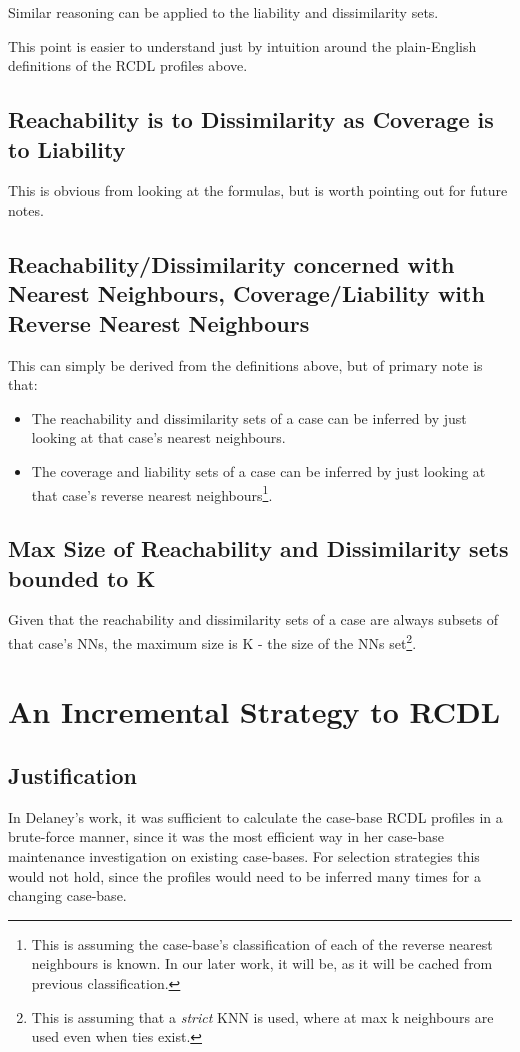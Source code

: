 \documentclass[a4paper,11pt]{report}
\begin{document}
Similar reasoning can be applied to the liability and dissimilarity sets.

This point is easier to understand just by intuition around the plain-English definitions of the RCDL profiles above.

\subsection{Reachability is to Dissimilarity as Coverage is to Liability}
This is obvious from looking at the formulas, but is worth pointing out for future notes.

\subsection{Reachability/Dissimilarity concerned with Nearest Neighbours, Coverage/Liability with Reverse Nearest Neighbours \label{sec:RdWithNnClWithRnn}}
This can simply be derived from the definitions above, but of primary note is that:
\begin{itemize}
	\item The reachability and dissimilarity sets of a case can be inferred by just looking at that case's nearest neighbours.
	\item The coverage and liability sets of a case can be inferred by just looking at that case's reverse nearest neighbours\footnote{This is assuming the case-base's classification of each of the reverse nearest neighbours is known. In our later work, it will be, as it will be cached from previous classification.}.
\end{itemize}

\subsection{Max Size of Reachability and Dissimilarity sets bounded to K}
Given that the reachability and dissimilarity sets of a case are always subsets of that case's NNs, the maximum size is K - the size of the NNs set\footnote{This is assuming that a \emph{strict} KNN is used, where at max k neighbours are used even when ties exist.}.

\section{An Incremental Strategy to RCDL\label{sec:incrstrategy}}
\subsection{Justification} 
In Delaney's work, it was sufficient to calculate the case-base RCDL profiles in a brute-force manner, since it was the most efficient way in her case-base maintenance investigation on existing case-bases. For selection strategies this would not hold, since the profiles would need to be inferred many times for a changing case-base.
\end{document}
